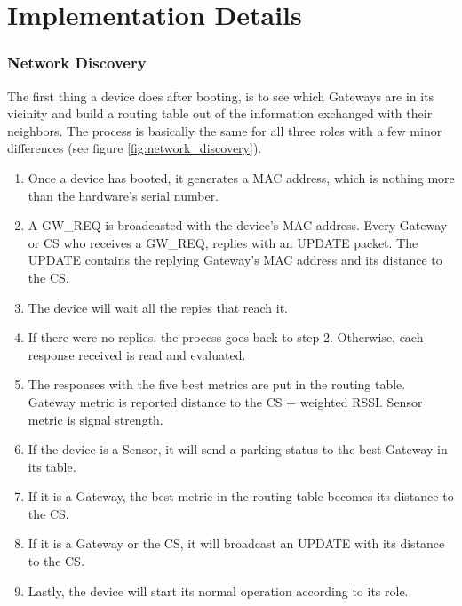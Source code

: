 ﻿\chapter{Implementation Details}
\label{chap:implementation_details}

\subsection{Network Discovery}
\label{sec:network_discovery}
The first thing a device does after booting, is to see which Gateways are in its vicinity and build a routing table out of the information exchanged with their neighbors.
The process is basically the same for all three roles with a few minor differences (see figure \ref{fig:network_discovery}).

\begin{enumerate} [noitemsep]
	\item Once a device has booted, it generates a MAC address, which is nothing more than the hardware's serial number.
	\item A GW\_REQ is broadcasted with the device's MAC address.
		Every Gateway or CS who receives a GW\_REQ, replies with an UPDATE packet. 
		The UPDATE contains the replying Gateway's MAC address and its distance to the CS.
	\item The device will wait all the repies that reach it.
	\item If there were no replies, the process goes back to step 2. 
		Otherwise, each response received is read and evaluated.
	\item The responses with the five best metrics are put in the routing table.
		Gateway metric is reported distance to the CS + weighted RSSI.
		Sensor metric is signal strength.
	\item If the device is a Sensor, it will send a parking status to the best Gateway in its table.
	\item If it is a Gateway, the best metric in the routing table becomes its distance to the CS.
	\item If it is a Gateway or the CS, it will broadcast an UPDATE with its distance to the CS.
	\item Lastly, the device will start its normal operation according to its role.
\end{enumerate}

